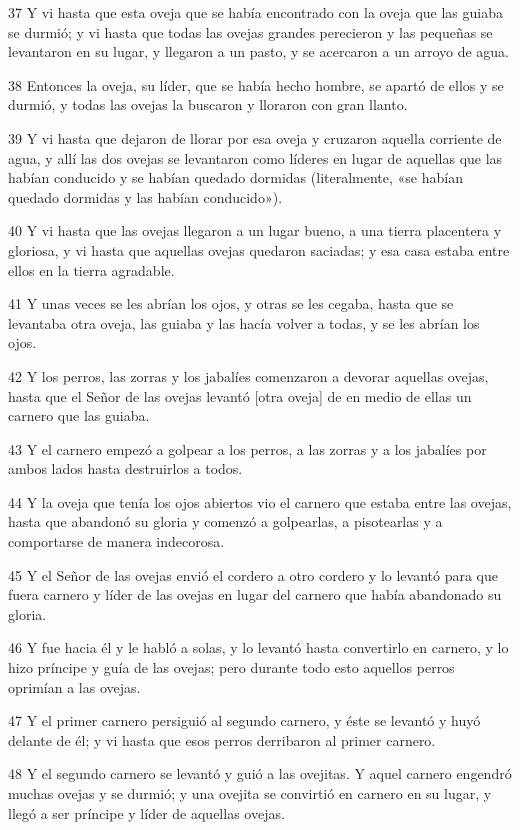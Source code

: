 \par 37 Y vi hasta que esta oveja que se había encontrado con la oveja que las guiaba se durmió; y vi hasta que todas las ovejas grandes perecieron y las pequeñas se levantaron en su lugar, y llegaron a un pasto, y se acercaron a un arroyo de agua.
\par 38 Entonces la oveja, su líder, que se había hecho hombre, se apartó de ellos y se durmió, y todas las ovejas la buscaron y lloraron con gran llanto.
\par 39 Y vi hasta que dejaron de llorar por esa oveja y cruzaron aquella corriente de agua, y allí las dos ovejas se levantaron como líderes en lugar de aquellas que las habían conducido y se habían quedado dormidas (literalmente, «se habían quedado dormidas y las habían conducido»).
\par 40 Y vi hasta que las ovejas llegaron a un lugar bueno, a una tierra placentera y gloriosa, y vi hasta que aquellas ovejas quedaron saciadas; y esa casa estaba entre ellos en la tierra agradable.
\par 41 Y unas veces se les abrían los ojos, y otras se les cegaba, hasta que se levantaba otra oveja, las guiaba y las hacía volver a todas, y se les abrían los ojos.
\par 42 Y los perros, las zorras y los jabalíes comenzaron a devorar aquellas ovejas, hasta que el Señor de las ovejas levantó [otra oveja] de en medio de ellas un carnero que las guiaba.
\par 43 Y el carnero empezó a golpear a los perros, a las zorras y a los jabalíes por ambos lados hasta destruirlos a todos.
\par 44 Y la oveja que tenía los ojos abiertos vio el carnero que estaba entre las ovejas, hasta que abandonó su gloria y comenzó a golpearlas, a pisotearlas y a comportarse de manera indecorosa.
\par 45 Y el Señor de las ovejas envió el cordero a otro cordero y lo levantó para que fuera carnero y líder de las ovejas en lugar del carnero que había abandonado su gloria.
\par 46 Y fue hacia él y le habló a solas, y lo levantó hasta convertirlo en carnero, y lo hizo príncipe y guía de las ovejas; pero durante todo esto aquellos perros oprimían a las ovejas.
\par 47 Y el primer carnero persiguió al segundo carnero, y éste se levantó y huyó delante de él; y vi hasta que esos perros derribaron al primer carnero.
\par 48 Y el segundo carnero se levantó y guió a las ovejitas. Y aquel carnero engendró muchas ovejas y se durmió; y una ovejita se convirtió en carnero en su lugar, y llegó a ser príncipe y líder de aquellas ovejas.
